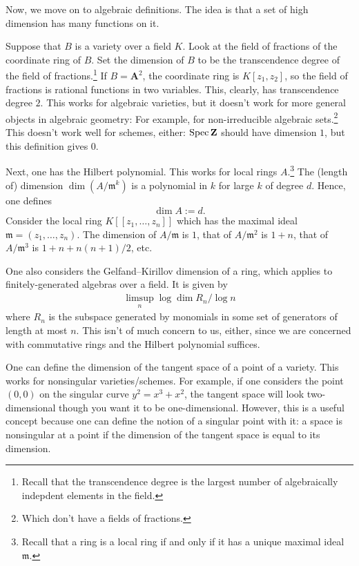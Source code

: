 \documentclass [11 pt, oneside] {article}
\begin{document}
Now, we move on to algebraic definitions. The idea is that a set of high dimension has many functions on it.

Suppose that $B$ is a variety over a field $K$. Look at the field of fractions of the coordinate ring of $B$. Set the dimension of $B$ to be the transcendence degree of the field of fractions.\footnote{Recall that the transcendence degree is the largest number of algebraically indepdent elements in the field.} If $B=\mathbf{A}^2$, the coordinate ring is $K[z_1,z_2]$, so the field of fractions is rational functions in two variables. This, clearly, has transcendence degree $2$. This works for algebraic varieties, but it doesn't work for more general objects in algebraic geometry: For example, for non-irreducible algebraic sets.\footnote{Which don't have a fields of fractions.} This doesn't work well for schemes, either: $\operatorname{Spec} \mathbf Z$ should have dimension $1$, but this definition gives $0$.

Next, one has the Hilbert polynomial. This works for local rings $A$.\footnote{Recall that a ring is a local ring if and only if it has a unique maximal ideal $\mathfrak{m}$.} The (length of) dimension $\dim(A/\mathfrak{m}^k)$ is a polynomial in $k$ for large $k$ of degree $d$. Hence, one defines
\[
	\dim A := d.
\] 
Consider the local ring $K [\![z_1,\hdots, z_n]\!]$ which has the maximal ideal $\mathfrak{m} = (z_1,\hdots, z_n)$. The dimension of $A/\mathfrak{m}$ is $1$, that of $A/\mathfrak{m}^2$ is $1+n$, that of $A/\mathfrak{m}^3$ is $1+n+n(n+1)/2$, etc.

One also considers the Gelfand--Kirillov dimension of a ring, which applies to finitely-generated algebras over a field. It is given by
\begin{align*}
	\limsup_{n} \log \dim R_n / \log n
\end{align*}
where $R_n$ is the subspace generated by monomials in some set of generators of length at most $n$. This isn't of much concern to us, either, since we are concerned with commutative rings and the Hilbert polynomial suffices.

One can define the dimension of the tangent space of a point of a variety. This works for nonsingular varieties/schemes. For example, if one considers the point $(0,0)$ on the singular curve $y^2=x^3+x^2$, the tangent space will look two-dimensional though you want it to be one-dimensional. However, this is a useful concept because one can define the notion of a singular point with it: a space is nonsingular at a point if the dimension of the tangent space is equal to its dimension.
\end{document}
